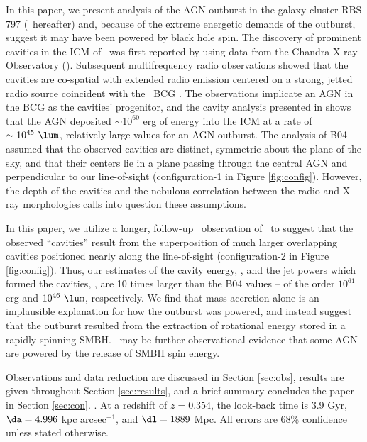 \documentclass[11pt, preprint]{aastex}
\begin{document}
In this paper, we present analysis of the AGN outburst in the galaxy
cluster RBS 797 (\rbs\ hereafter) and, because of the extreme
energetic demands of the outburst, suggest it may have been powered by
black hole spin. The discovery of prominent cavities in the ICM of
\rbs\ was first reported by \citet{schindler01} using data from the
Chandra X-ray Observatory (\cxo). Subsequent multifrequency radio
observations showed that the cavities are co-spatial with extended
radio emission centered on a strong, jetted radio source coincident
with the \rbs\ BCG \citep{2002astro.ph..1349D, gitti06, birzan08}. The
observations implicate an AGN in the BCG as the cavities' progenitor,
and the cavity analysis presented in \citet[][hereafter B04]{birzan04}
shows that the AGN deposited $\sim 10^{60}$ erg of energy into the ICM
at a rate of $\sim 10^{45} ~\lum$, relatively large values for an AGN
outburst. The analysis of B04 assumed that the observed cavities are
distinct, symmetric about the plane of the sky, and that their centers
lie in a plane passing through the central AGN and perpendicular to
our line-of-sight (configuration-1 in Figure
\ref{fig:config}). However, the depth of the cavities and the nebulous
correlation between the radio and X-ray morphologies calls into
question these assumptions.

In this paper, we utilize a longer, follow-up \cxo\ observation of
\rbs\ to suggest that the observed ``cavities'' result from the
superposition of much larger overlapping cavities positioned nearly
along the line-of-sight (configuration-2 in Figure
\ref{fig:config}). Thus, our estimates of the cavity energy, \ecav,
and the jet powers which formed the cavities, \pjet, are 10 times
larger than the B04 values -- of the order $10^{61}$ erg and $10^{46}
~\lum$, respectively. We find that mass accretion alone is an
implausible explanation for how the outburst was powered, and instead
suggest that the outburst resulted from the extraction of rotational
energy stored in a rapidly-spinning SMBH. \rbs\ may be further
observational evidence that some AGN are powered by the release of
SMBH spin energy.

Observations and data reduction are discussed in Section
\ref{sec:obs}, results are given throughout Section \ref{sec:results},
and a brief summary concludes the paper in Section
\ref{sec:con}. \LCDM. At a redshift of $z = 0.354$, the look-back time
is 3.9 Gyr, $\da = 4.996$ kpc arcsec$^{-1}$, and $\dl = 1889$ Mpc. All
errors are 68\% confidence unless stated otherwise.
\end{document}
